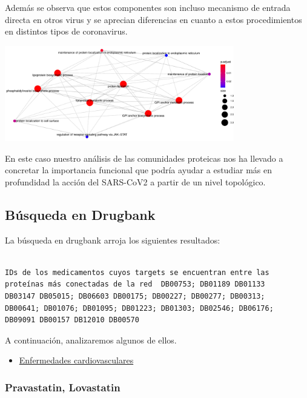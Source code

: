 Además se observa que estos componentes son incluso mecanismo de entrada directa en otros virus y se aprecian diferencias en cuanto a estos procedimientos en distintos tipos de coronavirus.

\vspace{1.5ex}
\begin{center}
\includegraphics[width=100mm,scale=1.1]{report/figures/enrichGO_enrich_map-BP-79.pdf}
\end{center}
\vspace{1.5ex}

En este caso nuestro análisis de las comunidades proteicas nos ha llevado a concretar la importancia funcional que podría ayudar a estudiar más en profundidad la acción del SARS-CoV2 a partir de un nivel topológico. 


\subsection{Búsqueda en Drugbank}

La búsqueda en drugbank arroja los siguientes resultados:

\begin{lstlisting}

IDs de los medicamentos cuyos targets se encuentran entre las
proteínas más conectadas de la red  DB00753; DB01189 DB01133 
DB03147 DB05015; DB06603 DB00175; DB00227; DB00277; DB00313;
DB00641; DB01076; DB01095; DB01223; DB01303; DB02546; DB06176;
DB09091 DB00157 DB12010 DB00570
\end{lstlisting}

A continuación, analizaremos algunos de ellos.\newline


\begin{itemize}
    \item \underline{Enfermedades cardiovasculares}
\end{itemize}


\subsubsection{Pravastatin, Lovastatin}

